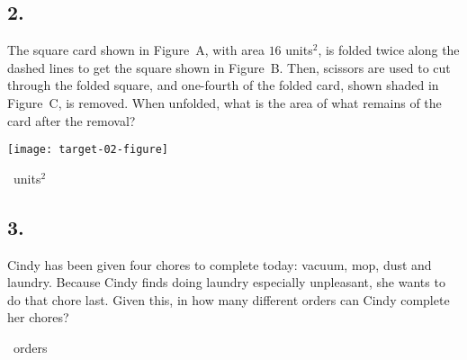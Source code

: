 \documentclass[12pt]{article}
\begin{document}
\subsection*{2.}
The square card shown in Figure~A, with area $16$ units$^2$, is folded twice along the dashed lines to get the square shown in Figure~B. Then, scissors are used to cut through the folded square, and one-fourth of the folded card, shown shaded in Figure~C, is removed. When unfolded, what is the area of what remains of the card after the removal? 

\begin{center}
\texttt{[image: target-02-figure]}
\end{center}

\nopagebreak

\fbox{\phantom{ANSWER}}~units$^2$

\begin{answer}
%
\end{answer}


\subsection*{3.}
Cindy has been given four chores to complete today: vacuum, mop, dust and laundry. Because Cindy finds doing laundry especially unpleasant, she wants to do that chore last. Given this, in how many different orders can Cindy complete her chores? 

\nopagebreak

\fbox{\phantom{ANSWER}}~orders
\end{document}

